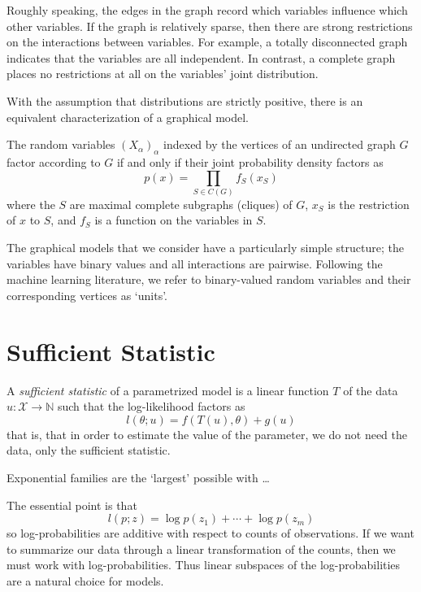 \documentclass[cclicense]{hmcthesis}
\providecommand*{\xs}{\mathcal X}
\providecommand*{\N}{\mathbb{N}}
\numberwithin{equation}{chapter}
\numberwithin{thmcounter}{chapter}
\begin{document}
    Roughly speaking, the edges in the graph record which variables influence
    which other variables.  If the graph is relatively sparse, then there are
    strong restrictions on the interactions between variables.  For example, a
    totally disconnected graph indicates that the variables are all independent.
    In contrast, a complete graph places no restrictions at all on the
    variables' joint distribution.
    
    With the assumption that distributions are strictly positive, there is an
    equivalent characterization of a graphical model.

    \begin{theorem}
        The random variables $(X_\alpha)_\alpha$ indexed by the vertices of an
        undirected graph $G$ factor according to $G$ if and only if their
        joint probability density factors as
        \[
            p(x) = \prod_{S \in C(G)} f_S(x_S)
        \]
        where the $S$ are maximal complete subgraphs (cliques) of $G$, $x_S$ is
        the restriction of $x$ to $S$, and $f_S$ is a function on the variables in
        $S$.
    \end{theorem}

    The graphical models that we consider have a particularly simple structure;
    the variables have binary values and all interactions are pairwise.
    Following the machine learning literature, we refer to binary-valued random
    variables and their corresponding vertices as `units'.

\section{Sufficient Statistic}
    \begin{definition}
        A \emph{sufficient statistic} of a parametrized model is a linear
        function $T$ of the data $u : \xs \to \N$ such that the log-likelihood
        factors as
        \[
            l(\theta; u) = f(T(u), \theta) + g(u)
        \]
        that is, that in order to estimate the value of the parameter, we do not
        need the data, only the sufficient statistic.
    \end{definition}

    \begin{theorem}
        Exponential families are the `largest' possible with \ldots
    \end{theorem}

    The essential point is that
    \[
        l(p; z) = \log p(z_1) + \cdots + \log p(z_m) 
    \]
    so log-probabilities are additive with respect to counts of observations.
    If we want to summarize our data through a linear transformation of the
    counts, then we must work with log-probabilities.  Thus linear subspaces of
    the log-probabilities are a natural choice for models.


\backmatter




\printindex
\end{document}
